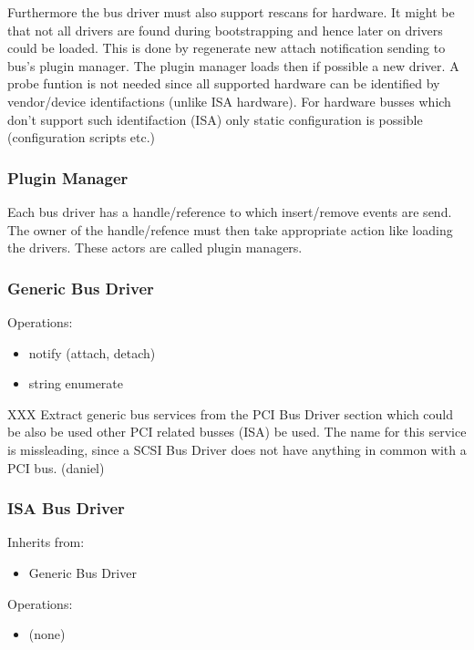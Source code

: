 \documentclass[9pt,a4paper]{extarticle}
\begin{document}
\begin{itemize}
  Furthermore the bus driver must also support rescans for hardware.
  It might be that not all drivers are found during bootstrapping and
  hence later on drivers could be loaded.  This is done by regenerate
  new attach notification sending to bus's plugin manager.  The plugin
  manager loads then if possible a new driver.  A probe funtion is not
  needed since all supported hardware can be identified by
  vendor/device identifactions (unlike ISA hardware).  For hardware
  busses which don't support such identifaction (ISA) only static
  configuration is possible (configuration scripts etc.)
\end{itemize}


\subsubsection{Plugin Manager}

  Each bus driver has a handle/reference to which insert/remove events
  are send.  The owner of the handle/refence must then take
  appropriate action like loading the drivers.  These actors are
  called plugin managers.

\subsubsection{Generic Bus Driver}

  Operations:
  \begin{itemize}
  \item notify (attach, detach)
  \item string enumerate
  \end{itemize}
  
  XXX Extract generic bus services from the PCI Bus Driver section
  which could be also be used other PCI related busses (ISA) be used.
  The name for this service is missleading, since a SCSI Bus Driver
  does not have anything in common with a PCI bus.  (daniel)

\subsubsection{ISA Bus Driver}
Inherits from:

\begin{itemize}
\item Generic Bus Driver
\end{itemize}

Operations:
\begin{itemize}
\item (none)
\end{itemize}
\end{document}

